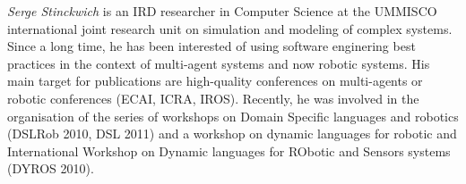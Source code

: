 \documentclass[runningheads]{llncs}
\begin{document}
\noindent \emph{Serge Stinckwich} is an IRD researcher in Computer Science at the UMMISCO international joint research unit on simulation and modeling of complex systems. Since a long time, he has been interested of using software enginering best practices in the context of multi-agent systems and now robotic systems. His main target for publications are high-quality conferences on multi-agents or robotic conferences (ECAI, ICRA, IROS). Recently, he was involved in the organisation of the series of workshops on Domain Specific languages and robotics (DSLRob 2010, DSL 2011) and a workshop on dynamic languages for robotic and International Workshop on Dynamic languages for RObotic and Sensors systems (DYROS 2010).\\

\end{document}
